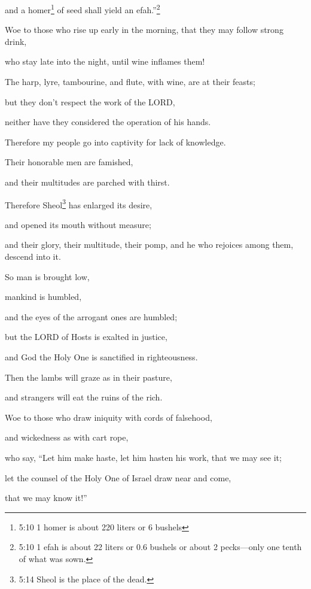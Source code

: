 and a homer\footnote{5:10 1 homer is about 220 liters or 6 bushels} of seed shall yield an efah.”\footnote{5:10 1 efah is about 22 liters or 0.6 bushels or about 2 pecks—only one tenth of what was sown.}

\myverse{}Woe to those who rise up early in the morning, that they may
follow strong drink,

who stay late into the night, until wine inflames them!

\myverse{}The harp, lyre, tambourine, and flute, with wine, are at their
feasts;

but they don’t respect the work of the LORD,

neither have they considered the operation of his hands.


\vspace{\baselineskip} \myverse{}Therefore my people go into captivity for lack of knowledge.

Their honorable men are famished,

and their multitudes are parched with thirst.

\myverse{}Therefore Sheol\footnote{5:14 Sheol is the place of the dead.} has enlarged its desire,

and opened its mouth without measure;

and their glory, their multitude, their pomp, and he who rejoices among them,
descend into it.

\myverse{}So man is brought low,

mankind is humbled,

and the eyes of the arrogant ones are humbled;

\myverse{}but the LORD of Hosts is exalted in justice,

and God the Holy One is sanctified in righteousness.

\myverse{}Then the lambs will graze as in their pasture,

and strangers will eat the ruins of the rich.


\vspace{\baselineskip} \myverse{}Woe to those who draw iniquity with cords of falsehood,

and wickedness as with cart rope,

\myverse{}who say, “Let him make haste, let him hasten his work, that
we may see it;

let the counsel of the Holy One of Israel draw near and come,

that we may know it!”

